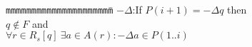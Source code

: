 

\begin{tabbing}
{\tt mmm}\={\tt mmmmmm}\={\tt mmmm}\={\tt mmmm}\={\tt mmmm}\=\kill
\>$-\Delta$:\>If $P(i+1) = -\Delta q$ then \\
\>\>\> $q\notin F$ and \\
\>\>\> $\forall r\in R_s[q] \ \exists a\in A(r): -\Delta a \in P(1..i)$ 
\end{tabbing}
